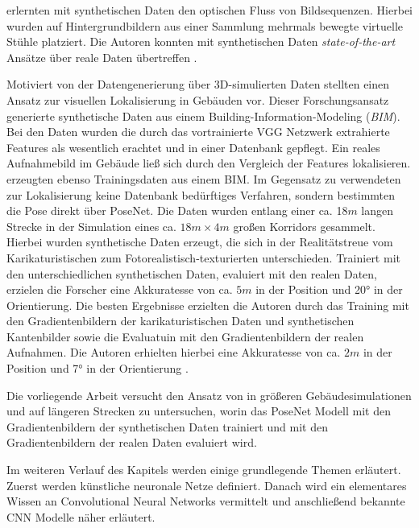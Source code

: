 erlernten mit synthetischen Daten den optischen Fluss von Bildsequenzen. Hierbei wurden auf Hintergrundbildern aus einer Sammlung mehrmals bewegte virtuelle Stühle platziert. Die Autoren konnten mit synthetischen Daten \textit{state-of-the-art} Ansätze über reale Daten übertreffen \cite{dosovitskiyFlowNetLearningOptical2015}.

Motiviert von der Datengenerierung über 3D-simulierten Daten stellten \citet{haImagebasedIndoorLocalization2018} einen Ansatz zur visuellen Lokalisierung in Gebäuden vor. Dieser Forschungsansatz generierte synthetische Daten aus einem Building-Information-Modeling (\textit{BIM}). Bei den Daten wurden die durch das vortrainierte VGG Netzwerk \cite{simonyanVeryDeepConvolutional2014} extrahierte Features als wesentlich erachtet und in einer Datenbank gepflegt. Ein reales Aufnahmebild im Gebäude ließ sich durch den Vergleich der Features lokalisieren. \citet{acharyaBIMPoseNetIndoorCamera2019} erzeugten ebenso Trainingsdaten aus einem BIM. Im Gegensatz zu \citet{haImagebasedIndoorLocalization2018} verwendeten \citet{acharyaBIMPoseNetIndoorCamera2019} zur Lokalisierung keine Datenbank bedürftiges Verfahren, sondern bestimmten die Pose direkt über PoseNet. Die Daten wurden entlang einer ca. 18$m$ langen Strecke in der Simulation eines ca. $18m \times 4m$ großen Korridors gesammelt. Hierbei wurden synthetische Daten erzeugt, die sich in der Realitätstreue vom Karikaturistischen zum Fotorealistisch-texturierten unterschieden. Trainiert mit den unterschiedlichen synthetischen Daten, evaluiert mit den realen Daten, erzielen die Forscher eine Akkuratesse von ca. $5m$ in der Position und 20° in der Orientierung.
Die besten Ergebnisse erzielten die Autoren durch das Training mit den Gradientenbildern der karikaturistischen Daten und synthetischen Kantenbilder sowie die Evaluatuin mit den Gradientenbildern der realen Aufnahmen. Die Autoren erhielten hierbei eine Akkuratesse von ca. $2m$ in der Position und 7° in der Orientierung \cite{acharyaBIMPoseNetIndoorCamera2019}.

Die vorliegende Arbeit versucht den Ansatz von \citet{acharyaBIMPoseNetIndoorCamera2019} in größeren Gebäudesimulationen und auf längeren Strecken zu untersuchen, worin das PoseNet Modell mit den Gradientenbildern der synthetischen Daten trainiert und mit den Gradientenbildern der realen Daten evaluiert wird.

Im weiteren Verlauf des Kapitels werden einige grundlegende Themen erläutert. Zuerst werden künstliche neuronale Netze definiert. Danach wird ein elementares Wissen an Convolutional Neural Networks vermittelt und anschließend bekannte CNN Modelle näher erläutert.

